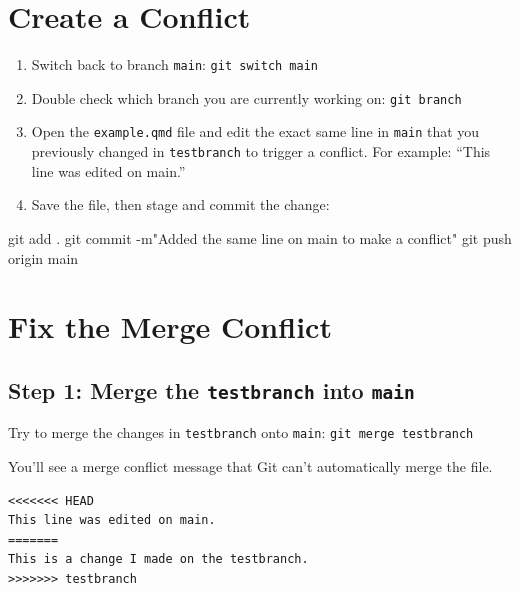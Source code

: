 \documentclass[
  11pt,
  letterpaper,
  DIV=11,
  numbers=noendperiod]{scrartcl}
\newenvironment{Shaded}{\begin{snugshade}}{\end{snugshade}}
\newcommand{\AttributeTok}[1]{\textcolor[rgb]{0.40,0.45,0.13}{#1}}
\newcommand{\FunctionTok}[1]{\textcolor[rgb]{0.28,0.35,0.67}{#1}}
\newcommand{\NormalTok}[1]{\textcolor[rgb]{0.00,0.23,0.31}{#1}}
\newcommand{\StringTok}[1]{\textcolor[rgb]{0.13,0.47,0.30}{#1}}
\providecommand{\tightlist}{%
  \setlength{\itemsep}{0pt}\setlength{\parskip}{0pt}}\usepackage{longtable,booktabs,array}
\let\textttOrig\texttt
\renewcommand{\texttt}[1]{\textttOrig{\colorbox{codebggray}{\textcolor{codefontcolor}{#1}}}}
\begin{document}
\section{Create a Conflict}\label{create-a-conflict}

\begin{enumerate}
\def\labelenumi{\arabic{enumi}.}
\tightlist
\item
  Switch back to branch \texttt{main}: \texttt{git\ switch\ main}
\item
  Double check which branch you are currently working on:
  \texttt{git\ branch}
\item
  Open the \texttt{example.qmd} file and edit the exact same line in
  \texttt{main} that you previously changed in \texttt{testbranch} to
  trigger a conflict. For example: ``This line was edited on main.''
\item
  Save the file, then stage and commit the change:
\end{enumerate}

\begin{Shaded}
\begin{Highlighting}[]
\FunctionTok{git}\NormalTok{ add .}
\FunctionTok{git}\NormalTok{ commit }\AttributeTok{{-}m}\StringTok{"Added the same line on main to make a conflict"}
\FunctionTok{git}\NormalTok{ push origin main}
\end{Highlighting}
\end{Shaded}

\newpage

\section{Fix the Merge Conflict}\label{fix-the-merge-conflict}

\subsection{\texorpdfstring{Step 1: Merge the \texttt{testbranch} into
\texttt{main}}{Step 1: Merge the testbranch into main}}\label{step-1-merge-the-testbranch-into-main}

Try to merge the changes in \texttt{testbranch} onto \texttt{main}:
\texttt{git\ merge\ testbranch}

You'll see a merge conflict message that Git can't automatically merge
the file.

\begin{verbatim}
<<<<<<< HEAD
This line was edited on main.
=======
This is a change I made on the testbranch.
>>>>>>> testbranch
\end{verbatim}
\end{document}
